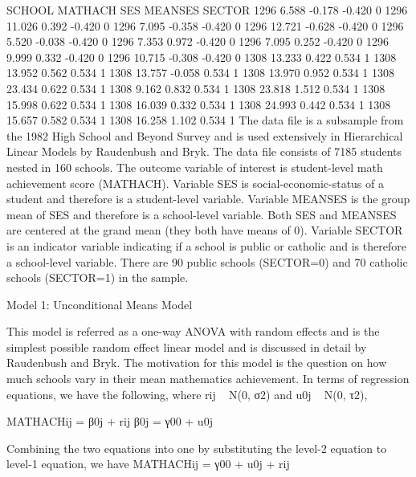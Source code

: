 SCHOOL    MATHACH      SES     MEANSES    SECTOR
 1296       6.588    -0.178     -0.420       0
 1296      11.026     0.392     -0.420       0
 1296       7.095    -0.358     -0.420       0
 1296      12.721    -0.628     -0.420       0
 1296       5.520    -0.038     -0.420       0
 1296       7.353     0.972     -0.420       0
 1296       7.095     0.252     -0.420       0
 1296       9.999     0.332     -0.420       0
 1296      10.715    -0.308     -0.420       0
 1308      13.233     0.422      0.534       1
 1308      13.952     0.562      0.534       1
 1308      13.757    -0.058      0.534       1
 1308      13.970     0.952      0.534       1
 1308      23.434     0.622      0.534       1
 1308       9.162     0.832      0.534       1
 1308      23.818     1.512      0.534       1
 1308      15.998     0.622      0.534       1
 1308      16.039     0.332      0.534       1
 1308      24.993     0.442      0.534       1
 1308      15.657     0.582      0.534       1
 1308      16.258     1.102      0.534       1
The data file is a subsample from the 1982 High School and Beyond Survey and is used extensively in Hierarchical Linear Models by Raudenbush and Bryk. The data file consists of 7185 students nested in 160 schools. The outcome variable of interest is student-level math achievement score (MATHACH). Variable SES is social-economic-status of a student and therefore is a student-level variable. Variable MEANSES is the group mean of SES and therefore is a school-level variable. Both SES and MEANSES are centered at the grand mean (they both have means of 0). Variable  SECTOR is an indicator variable indicating if a school is public or catholic and is therefore a school-level variable. There are 90 public schools (SECTOR=0) and 70 catholic schools (SECTOR=1) in the sample.

Model 1: Unconditional Means Model

This model is referred as a one-way ANOVA with random effects and is the simplest possible random effect linear model and is discussed in detail by Raudenbush and Bryk. The motivation for this model is the question on  how much schools vary in their mean mathematics achievement. In terms of regression equations, we have the following, where rij ~ N(0, σ2) and u0j ~ N(0, τ2),

MATHACHij =  β0j + rij   
β0j =  γ00 + u0j

Combining the two equations into one by substituting the level-2 equation to level-1 equation, we have
MATHACHij =  γ00 + u0j + rij  

